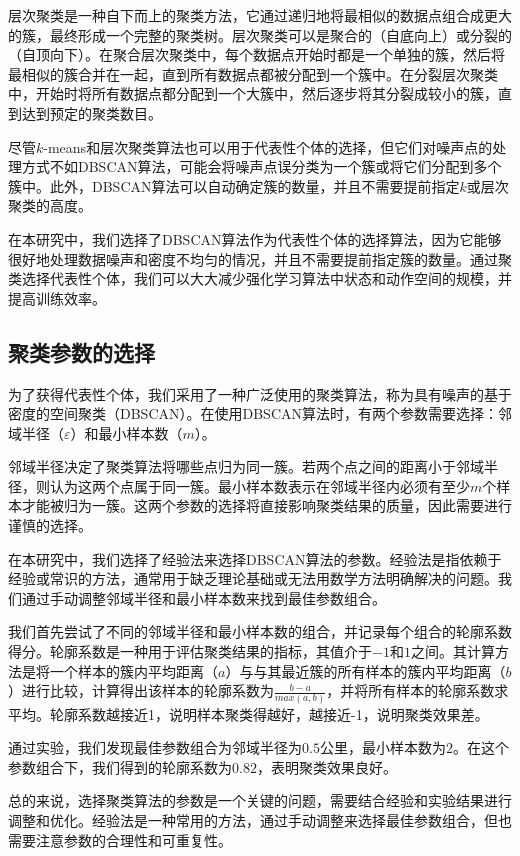 层次聚类是一种自下而上的聚类方法，它通过递归地将最相似的数据点组合成更大的簇，最终形成一个完整的聚类树。层次聚类可以是聚合的（自底向上）或分裂的（自顶向下）。在聚合层次聚类中，每个数据点开始时都是一个单独的簇，然后将最相似的簇合并在一起，直到所有数据点都被分配到一个簇中。在分裂层次聚类中，开始时将所有数据点都分配到一个大簇中，然后逐步将其分裂成较小的簇，直到达到预定的聚类数目。

尽管$k$-means和层次聚类算法也可以用于代表性个体的选择，但它们对噪声点的处理方式不如DBSCAN算法，可能会将噪声点误分类为一个簇或将它们分配到多个簇中。此外，DBSCAN算法可以自动确定簇的数量，并且不需要提前指定$k$或层次聚类的高度。

在本研究中，我们选择了DBSCAN算法作为代表性个体的选择算法，因为它能够很好地处理数据噪声和密度不均匀的情况，并且不需要提前指定簇的数量。通过聚类选择代表性个体，我们可以大大减少强化学习算法中状态和动作空间的规模，并提高训练效率。


\subsection{聚类参数的选择}
为了获得代表性个体，我们采用了一种广泛使用的聚类算法，称为具有噪声的基于密度的空间聚类（DBSCAN）\citep{ester1996density}。在使用DBSCAN算法时，有两个参数需要选择：邻域半径（$\varepsilon$）和最小样本数（$m$）。

邻域半径决定了聚类算法将哪些点归为同一簇。若两个点之间的距离小于邻域半径，则认为这两个点属于同一簇。最小样本数表示在邻域半径内必须有至少$m$个样本才能被归为一簇。这两个参数的选择将直接影响聚类结果的质量，因此需要进行谨慎的选择。

在本研究中，我们选择了经验法来选择DBSCAN算法的参数。经验法是指依赖于经验或常识的方法，通常用于缺乏理论基础或无法用数学方法明确解决的问题。我们通过手动调整邻域半径和最小样本数来找到最佳参数组合。

我们首先尝试了不同的邻域半径和最小样本数的组合，并记录每个组合的轮廓系数得分。轮廓系数是一种用于评估聚类结果的指标，其值介于$-1$和$1$之间。其计算方法是将一个样本的簇内平均距离（$a$）与与其最近簇的所有样本的簇内平均距离（$b$）进行比较，计算得出该样本的轮廓系数为$\frac{b-a}{max(a,b)}$，并将所有样本的轮廓系数求平均。轮廓系数越接近1，说明样本聚类得越好，越接近-1，说明聚类效果差。

通过实验，我们发现最佳参数组合为邻域半径为$0.5$公里，最小样本数为$2$。在这个参数组合下，我们得到的轮廓系数为$0.82$，表明聚类效果良好。

总的来说，选择聚类算法的参数是一个关键的问题，需要结合经验和实验结果进行调整和优化。经验法是一种常用的方法，通过手动调整来选择最佳参数组合，但也需要注意参数的合理性和可重复性。

